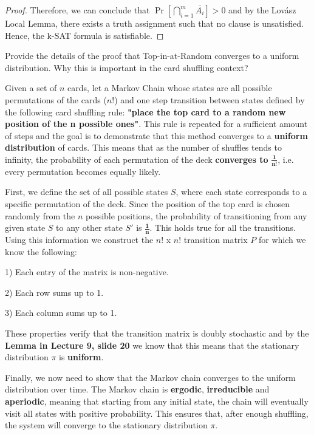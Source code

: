 \documentclass[12pt,letterpaper, onecolumn]{exam}
\begin{document}
{\begin{questions}
\begin{solution}
\begin{proof}
Therefore, we can conclude that \(\Pr\left[ \bigcap_{i=1}^{m} \overline{A_i} \right] > 0\) and by the Lovász Local Lemma, there exists a truth assignment such that no clause is unsatisfied. Hence, the k-SAT formula is satisfiable.
    \end{proof}
    \end{solution}

    \question Provide the details of the proof that Top-in-at-Random converges to a uniform distribution. Why this is important in the card shuffling context?\droppoints
    \begin{solution}
    
    Given a set of $n$ cards, let a Markov Chain whose states are all possible permutations of the cards ($n$!) and one step transition between states defined by the following card shuffling rule: \textbf{"place the top card to a random new position of the n possible ones"}. This rule is repeated for a sufficient amount of steps and the goal is to demonstrate that this method converges to a \textbf{uniform distribution} of cards. This means that as the number of shuffles tends to infinity, the probability of each permutation of the deck \textbf{converges to} \(\bm{\frac{1}{n!}}\), i.e. every permutation becomes equally likely.

    First, we define the set of all possible states $S$, where each state corresponds to a specific permutation of the deck. Since the position of the top card is chosen randomly from the $n$ possible positions, the probability of transitioning from any given state $S$ to any other state $S'$ is \(\bm{\frac{1}{n}}\). This holds true for all the transitions. Using this information we construct the $n!$ x $n!$ transition matrix $P$ for which we know the following:
    
    1) Each entry of the matrix is non-negative.

    2) Each row sums up to 1.

    3) Each column sums up to 1.

    These properties verify that the transition matrix is doubly stochastic and by the \textbf{Lemma in Lecture 9, slide 20} we know that this means that the stationary distribution \(\pi\) is \textbf{uniform}. 

    Finally, we now need to show that the Markov chain converges to the uniform distribution over time. The Markov chain is \textbf{ergodic}, \textbf{irreducible} and \textbf{aperiodic}, meaning that starting from any initial state, the chain will eventually visit all states with positive probability. This ensures that, after enough shuffling, the system will converge to the stationary distribution \(\pi\).


\end{solution}
\end{questions}}
\end{document}
